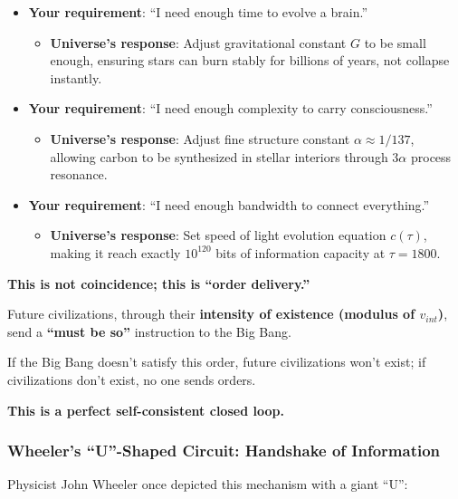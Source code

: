 \begin{itemize}
\item \textbf{Your requirement}: ``I need enough time to evolve a brain.''

\begin{itemize}
\item \textbf{Universe's response}: Adjust gravitational constant $G$ to be small enough, ensuring stars can burn stably for billions of years, not collapse instantly.
\end{itemize}

\item \textbf{Your requirement}: ``I need enough complexity to carry consciousness.''

\begin{itemize}
\item \textbf{Universe's response}: Adjust fine structure constant $\alpha \approx 1/137$, allowing carbon to be synthesized in stellar interiors through 3$\alpha$ process resonance.
\end{itemize}

\item \textbf{Your requirement}: ``I need enough bandwidth to connect everything.''

\begin{itemize}
\item \textbf{Universe's response}: Set speed of light evolution equation $c(\tau)$, making it reach exactly $10^{120}$ bits of information capacity at $\tau=1800$.
\end{itemize}
\end{itemize}

\textbf{This is not coincidence; this is ``order delivery.''}

Future civilizations, through their \textbf{intensity of existence (modulus of $v_{int}$)}, send a \textbf{``must be so''} instruction to the Big Bang.

If the Big Bang doesn't satisfy this order, future civilizations won't exist; if civilizations don't exist, no one sends orders.

\textbf{This is a perfect self-consistent closed loop.}

\subsubsection{Wheeler's ``U''-Shaped Circuit: Handshake of Information}

Physicist John Wheeler once depicted this mechanism with a giant ``U'':

